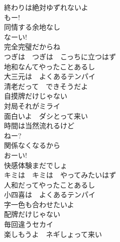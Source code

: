{終わりは絶対ゆずれないよ\\
もー!\\
同情する余地なし\\
なーい!\\
完全完璧だからね\\
つぎは　つぎは　こっちに立つはず\\

地和なんてやったことあるし\\
大三元は　よくあるテンパイ\\
清老だって　できそうだよ\\
自摸牌だけじゃない\\

対局それがミライ\\
面白いよ　ダシとって来い\\

時間は当然流れるけど\\
ねー?\\
関係なくなるから\\
おーい!\\
快感体験まだでしょ\\
キミは　キミは　やってみたいはず\\

人和だってやったことあるし\\
小四喜は　よくあるテンパイ\\
字一色も合わせたいよ\\
配牌だけじゃない\\

毎回違うセカイ\\
楽しもうよ　ネギしょって来い
}

